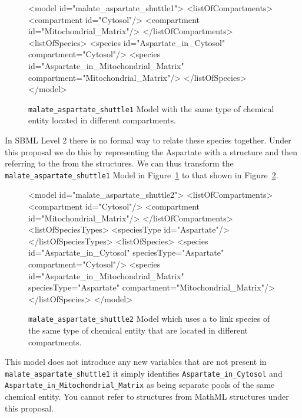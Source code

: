 \documentclass{cekarticle}
\begin{document}
\begin{figure}[h]
\begin{example}
<model id="malate_aspartate_shuttle1">
    <listOfCompartments>
        <compartment id="Cytosol"/>
        <compartment id="Mitochondrial_Matrix"/>
    </listOfCompartments>
    <listOfSpecies>
        <species id="Aspartate_in_Cytosol" compartment="Cytosol"/>
        <species id="Aspartate_in_Mitochondrial_Matrix" compartment="Mitochondrial_Matrix"/>
    </listOfSpecies>
</model>
\end{example}
\caption{\texttt{malate\_aspartate\_shuttle1} Model with the same type of chemical entity located in
different compartments.} 
\label{fig:malate_aspartate_shuttle1-xml}
\end{figure}

In SBML Level 2 there is no formal way to relate these species together.  Under this proposal
we do this by representing the Aspartate with a  structure and then
referring to the  from the  structures.  We can thus transform the 
\texttt{malate\_aspartate\_shuttle1} Model in Figure~\ref{fig:malate_aspartate_shuttle1-xml} to that
shown in Figure~\ref{fig:malate_aspartate_shuttle2-xml}.

\begin{figure}[h]
\begin{example}
<model id="malate_aspartate_shuttle2">
    <listOfCompartments>
        <compartment id="Cytosol"/>
        <compartment id="Mitochondrial_Matrix"/>
    </listOfCompartments>
    <listOfSpeciesTypes>
        <speciesType id="Aspartate"/>
    </listOfSpeciesTypes>
    <listOfSpecies>
        <species
            id="Aspartate_in_Cytosol"
            speciesType="Aspartate"
            compartment="Cytosol"/>
        <species
            id="Aspartate_in_Mitochondrial_Matrix"
            speciesType="Aspartate"
            compartment="Mitochondrial_Matrix"/>
    </listOfSpecies>
</model>
\end{example}
\caption{\texttt{malate\_aspartate\_shuttle2} Model which uses a  to link species of
the same type of chemical entity that are located in different compartments.} 
\label{fig:malate_aspartate_shuttle2-xml}
\end{figure}

This model does not introduce any new variables that are not present in
\texttt{malate\_aspartate\_shuttle1} it simply identifies \texttt{Aspartate\_in\_Cytosol}
and \texttt{Aspartate\_in\_Mitochondrial\_Matrix} as being separate pools of the same chemical entity.
You cannot refer to  structures from MathML structures under this proposal.
\end{document}
